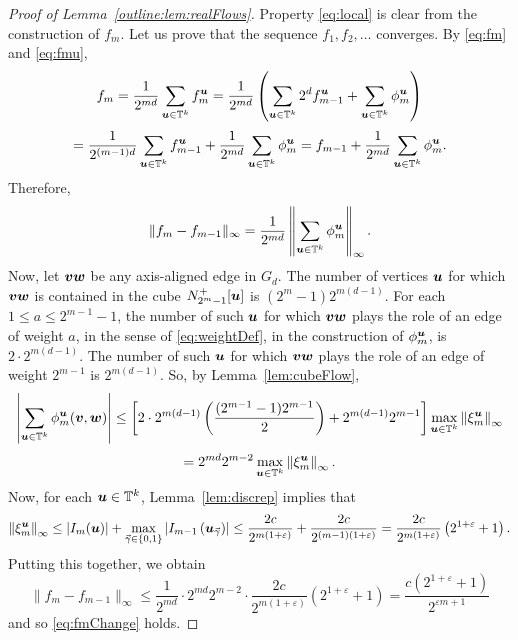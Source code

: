 \documentclass[12pt,a4paper]{amsart}
\numberwithin{equation}{section}
\theoremstyle{definition}
\begin{document}
\begin{proof}[Proof of Lemma~\ref{outline:lem:realFlows}]
Property \eqref{eq:local} is clear from the construction of $f_m$. Let us prove that the sequence $f_1,f_2,\dots$ converges. By \eqref{eq:fm} and \eqref{eq:fmu},
\[f_m = \frac{1}{2^{md}}\sum_{\boldsymbol{u}\in\mathbb{T}^k}f_m^{\boldsymbol{u}}= \frac{1}{2^{md}}\left(\sum_{\boldsymbol{u}\in\mathbb{T}^k}2^df_{m-1}^{\boldsymbol{u}} + \sum_{\boldsymbol{u}\in\mathbb{T}^k}\phi_m^{\boldsymbol{u}}\right)\]
\[ = \frac{1}{2^{(m-1)d}}\sum_{\boldsymbol{u}\in\mathbb{T}^k}f_{m-1}^{\boldsymbol{u}}+\frac{1}{2^{md}}\sum_{\boldsymbol{u}\in\mathbb{T}^k}\phi_m^{\boldsymbol{u}} = f_{m-1}+\frac{1}{2^{md}}\sum_{\boldsymbol{u}\in\mathbb{T}^k}\phi_m^{\boldsymbol{u}}.\]
Therefore,
\[\|f_m-f_{m-1}\|_\infty = \frac{1}{2^{md}}\left\|\sum_{\boldsymbol{u}\in\mathbb{T}^k}\phi_m^{\boldsymbol{u}}\right\|_\infty.\]
Now, let $\boldsymbol{v}\boldsymbol{w}$ be any axis-aligned edge in $G_d$. The number of vertices $\boldsymbol{u}$ for which $\boldsymbol{v}\boldsymbol{w}$ is contained in the cube $N_{2^m-1}^+[\boldsymbol{u}]$ is $(2^m-1)2^{m(d-1)}$. For each $1\leq a\leq 2^{m-1}-1$, the number of such $\boldsymbol{u}$ for which $\boldsymbol{v}\boldsymbol{w}$ plays the role of an edge of weight $a$, in the sense of \eqref{eq:weightDef}, in the construction of $\phi_m^{\boldsymbol{u}}$, is $2\cdot 2^{m(d-1)}$. The number of such $\boldsymbol{u}$ for which $\boldsymbol{v}\boldsymbol{w}$ plays the role of an edge of weight $2^{m-1}$ is $2^{m(d-1)}$. So, by Lemma~\ref{lem:cubeFlow},
\[\left|\sum_{\boldsymbol{u}\in\mathbb{T}^k}\phi_m^{\boldsymbol{u}}(\boldsymbol{v},\boldsymbol{w})\right|\leq \left[2\cdot 2^{m(d-1)}\left(\frac{(2^{m-1}-1)2^{m-1}}{2}\right) + 2^{m(d-1)}2^{m-1}\right]\max_{\boldsymbol{u}\in \mathbb{T}^k}\left\|\xi_m^{\boldsymbol{u}}\right\|_\infty\]
\[=2^{md}2^{m-2}\max_{\boldsymbol{u}\in \mathbb{T}^k}\left\|\xi_m^{\boldsymbol{u}}\right\|_\infty.\]
Now, for each $\boldsymbol{u}\in \mathbb{T}^k$,  Lemma~\ref{lem:discrep} implies that
\[\left\|\xi_m^{\boldsymbol{u}}\right\|_\infty \leq \left|I_m(\boldsymbol{u})\right|+\max_{\vec{\gamma}\in\{0,1\}}\left|I_{m-1}\left(\boldsymbol{u}_{\vec{\gamma}}\right)\right|\leq \frac{2c}{2^{m(1+\varepsilon)}} + \frac{2c}{2^{(m-1)(1+\varepsilon)}} = \frac{2c}{2^{m(1+\varepsilon)}}\left(2^{1+\varepsilon}+1\right).\]
Putting this together, we obtain
\[\|f_m-f_{m-1}\|_\infty\leq \frac{1}{2^{md}}\cdot 2^{md}2^{m-2}\cdot \frac{2c}{2^{m(1+\varepsilon)}}\left(2^{1+\varepsilon}+1\right)=\frac{c(2^{1+\varepsilon}+1)}{2^{\varepsilon m+1}}\]
and so \eqref{eq:fmChange} holds.


\end{proof}
\end{document}
